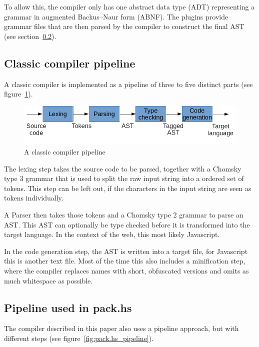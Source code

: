 To allow this, the compiler only has one abstract data type (ADT) representing a grammar in  augmented Backus–Naur form (ABNF). The plugins provide grammar files that are then parsed by the compiler to construct the final AST (see section~\ref{sec:pack_pipeline}).

\subsection{Classic compiler pipeline}

A classic compiler is implemented as a pipeline of three to five distinct parts (see figure~\ref{fig:compiler_pipeline}).

\begin{figure}[H]
\includegraphics[width=\columnwidth]{./compiler_pipeline.png}
\caption{A classic compiler pipeline}%
\label{fig:compiler_pipeline}
\end{figure}

The lexing step takes the source code to be parsed, together with a Chomsky type 3 grammar that is used to split the raw input string into a ordered set of tokens. This step can be left out, if the characters in the input string are seen as tokens individually.

A Parser then takes those tokens and a Chomsky type 2 grammar to parse an AST\@. This AST can optionally be type checked before it is transformed into the target language. In the context of the web, this most likely Javascript.

In the code generation step, the AST is written into a target file, for Javascript this is another text file. Most of the time this also includes a minification step, where the compiler replaces names with short, obfuscated versions and omits as much whitespace as possible.

\subsection{Pipeline used in pack.hs}
\label{sec:pack_pipeline}

The compiler described in this paper also uses a pipeline approach, but with different steps (see figure~\ref{fig:pack.hs_pipeline}).

